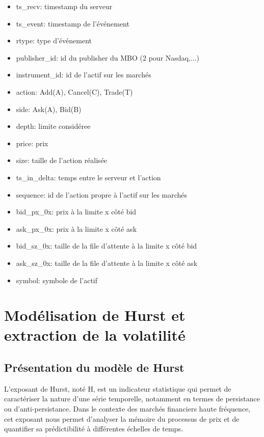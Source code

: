 \documentclass[12pt,a4paper]{article}
\theoremstyle{definition}
\theoremstyle{remark}
\begin{document}
\begin{itemize}
    \item ts\_recv: timestamp du serveur 
    \item ts\_event: timestamp de l'événement     
    \item rtype: type d'événement     
    \item publisher\_id: id du publisher du MBO (2 pour Nasdaq,...)
    \item instrument\_id: id de l'actif sur les marchés
    \item action: Add(A), Cancel(C), Trade(T)
    \item side: Ask(A), Bid(B)
    \item depth: limite considéree
    \item price: prix
    \item size: taille de l'action réalisée
    \item ts\_in\_delta: temps entre le serveur et l'action
    \item sequence: id de l'action propre à l'actif sur les marchés
    \item bid\_px\_0x: prix à la limite x côté bid
    \item ask\_px\_0x: prix à la limite x côté ask
    \item bid\_sz\_0x: taille de la file d'attente à la limite x côté bid
    \item ask\_sz\_0x: taille de la file d'attente à la limite x côté ask
    \item symbol: symbole de l'actif
\end{itemize}


\section{Modélisation de Hurst et extraction de la volatilité}

\subsection{Présentation du modèle de Hurst}

L'exposant de Hurst, noté H, est un indicateur statistique qui permet de caractériser la nature d'une série temporelle, notamment en termes de persistance ou d'anti-persistance. Dans le contexte des marchés financiers haute fréquence, cet exposant nous permet d'analyser la mémoire du processus de prix et de quantifier sa prédictibilité à différentes échelles de temps.
\end{document}
